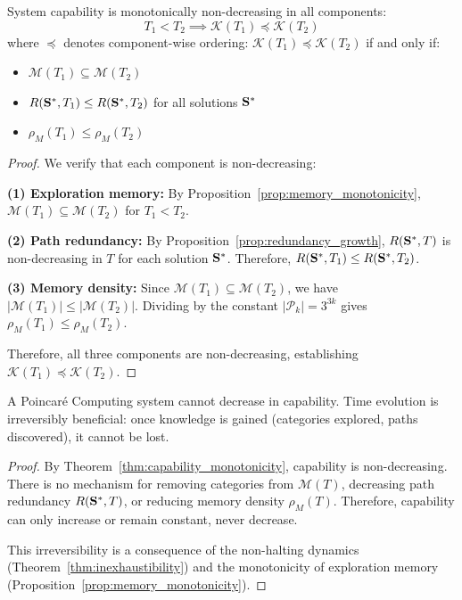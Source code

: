 \begin{theorem}
\label{thm:capability_monotonicity}
System capability is monotonically non-decreasing in all components:
\begin{equation}
T_1 < T_2 \implies \mathcal{K}(T_1) \preceq \mathcal{K}(T_2)
\label{eq:capability_monotonicity}
\end{equation}
where $\preceq$ denotes component-wise ordering: $\mathcal{K}(T_1) \preceq \mathcal{K}(T_2)$ if and only if:
\begin{itemize}
    \item $\mathcal{M}(T_1) \subseteq \mathcal{M}(T_2)$
    \item $R(\mathbf{S}^*, T_1) \leq R(\mathbf{S}^*, T_2)$ for all solutions $\mathbf{S}^*$
    \item $\rho_M(T_1) \leq \rho_M(T_2)$
\end{itemize}
\end{theorem}

\begin{proof}
We verify that each component is non-decreasing:

\textbf{(1) Exploration memory:} By Proposition~\ref{prop:memory_monotonicity}, $\mathcal{M}(T_1) \subseteq \mathcal{M}(T_2)$ for $T_1 < T_2$.

\textbf{(2) Path redundancy:} By Proposition~\ref{prop:redundancy_growth}, $R(\mathbf{S}^*, T)$ is non-decreasing in $T$ for each solution $\mathbf{S}^*$. Therefore, $R(\mathbf{S}^*, T_1) \leq R(\mathbf{S}^*, T_2)$.

\textbf{(3) Memory density:} Since $\mathcal{M}(T_1) \subseteq \mathcal{M}(T_2)$, we have $|\mathcal{M}(T_1)| \leq |\mathcal{M}(T_2)|$. Dividing by the constant $|\mathcal{P}_k| = 3^{3k}$ gives $\rho_M(T_1) \leq \rho_M(T_2)$.

Therefore, all three components are non-decreasing, establishing $\mathcal{K}(T_1) \preceq \mathcal{K}(T_2)$.
\end{proof}

\begin{corollary}
\label{cor:irreversible_improvement}
A Poincaré Computing system cannot decrease in capability. Time evolution is irreversibly beneficial: once knowledge is gained (categories explored, paths discovered), it cannot be lost.
\end{corollary}

\begin{proof}
By Theorem~\ref{thm:capability_monotonicity}, capability is non-decreasing. There is no mechanism for removing categories from $\mathcal{M}(T)$, decreasing path redundancy $R(\mathbf{S}^*, T)$, or reducing memory density $\rho_M(T)$. Therefore, capability can only increase or remain constant, never decrease.

This irreversibility is a consequence of the non-halting dynamics (Theorem~\ref{thm:inexhaustibility}) and the monotonicity of exploration memory (Proposition~\ref{prop:memory_monotonicity}).
\end{proof}


